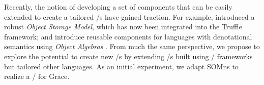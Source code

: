 Recently, the notion of developing a set of components that can be easily extended to create a tailored \VM/s have gained traction. For example,  introduced a robust \emph{Object Storage Model}, which has now been integrated into the Truffle framework; and  introduce reusable components for languages with denotational semantics using \emph{Object Algebras} . From much the same perspective, we propose to explore the potential to create new \VM/s by extending \VM/s built using \VM/ frameworks but tailored other languages. As an initial experiment, we adapt SOMns to realize a \VM/ for Grace.


%




%






% 
